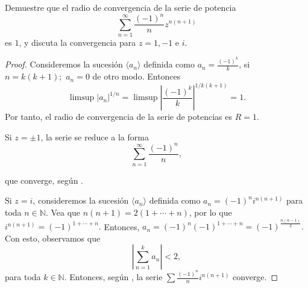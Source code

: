 \documentclass[12pt]{article}
\newcommand{\N}{\mathbb{N}}
\newenvironment{problem}[2][Problema]{\begin{trivlist}
\item[\hskip \labelsep {\bfseries #1}\hskip \labelsep {\bfseries #2.}]}{\end{trivlist}}
\begin{document}
\begin{problem}{7 pp. 33}
Demuestre que el radio de convergencia de la serie de potencia
$$
\sum_{n=1}^\infty \frac{(-1)^n}{n} z^{n(n+1)}
$$
es $1$, y discuta la convergencia para $z =1, -1$ e $i.$
\end{problem}
\begin{proof}
Consideremos la sucesión $\langle a_n \rangle$ definida como $a_n = \frac{(-1)^k}{k}$, si $n = k(k+1);$ $a_n = 0$ de otro modo. Entonces 
$$
\limsup \lvert a_n \lvert^{1/n} = \limsup \left\lvert \frac{(-1)^k}{k} \right \rvert^{1 / k(k+1)} = 1.
$$
Por tanto, el radio de convergencia de la serie de potencias es $R = 1.$

Si $z = \pm 1$, la serie se reduce a la forma
$$
\sum_{n=1}^\infty \frac{(-1)^n}{n},
$$

que converge, según \cite[Teorema 3.46]{MR0055409}.

Si $z = i$, consideremos la sucesión $\langle a_n \rangle$ definida como $a_n = (-1)^n i^{n (n+1)}$ para toda $n \in \N.$ Vea que $n(n+1) = 2(1 + \cdots + n)$, por lo que $i^{n(n+1)} = (-1)^{1 + \cdots + n}.$ Entonces, $a_n = (-1)^{n} (-1)^{1 + \cdots + n} = (-1)^{\frac{n(n-1)}{2}}.$ Con esto, observamos que
$$
\left \lvert \sum_{n=1}^{k}a_n \right\rvert < 2,
$$
para toda $k \in \N.$ Entonces, según  \cite[Teorema 3.42]{MR0055409}, la serie $\sum \frac{(-1)^n}{n} i^{n(n+1)}$ converge.
\end{proof}
\end{document}
